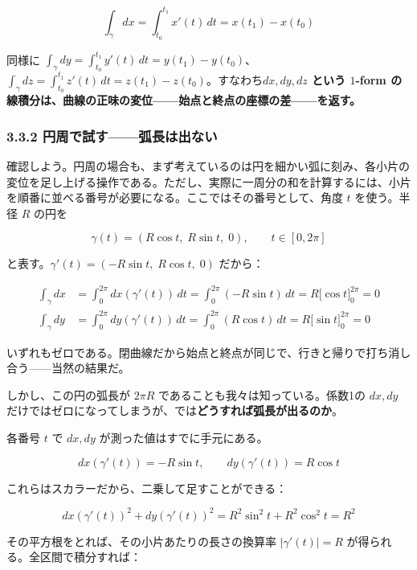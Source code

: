 \documentclass[a4paper,12pt,openany]{book}
\begin{document}
\[\int_\gamma dx = \int_{t_0}^{t_1} x'(t)\,dt = x(t_1) - x(t_0)\]

同様に
\(\int_\gamma dy = \int_{t_0}^{t_1} y'(t)\,dt = y(t_1) - y(t_0)\)、\(\int_\gamma dz = \int_{t_0}^{t_1} z'(t)\,dt = z(t_1) - z(t_0)\)。すなわち\textbf{$dx, dy, dz$ という $1$-form の線積分は、曲線の正味の変位——始点と終点の座標の差——を返す。}

\hypertarget{ux5186ux5468ux3067ux8a66ux3059ux5f27ux9577ux306fux51faux306aux3044}{%
\subsubsection{3.3.2
円周で試す——弧長は出ない}\label{ux5186ux5468ux3067ux8a66ux3059ux5f27ux9577ux306fux51faux306aux3044}}

確認しよう。円周の場合も、まず考えているのは円を細かい弧に刻み、各小片の変位を足し上げる操作である。ただし、実際に一周分の和を計算するには、小片を順番に並べる番号が必要になる。ここではその番号として、角度
\(t\) を使う。半径 \(R\) の円を

\[\gamma(t) = (R\cos t,\; R\sin t,\; 0),\qquad t \in [0, 2\pi]\]

と表す。\(\gamma'(t) = (-R\sin t,\; R\cos t,\; 0)\) だから：

\[\begin{aligned}
\int_\gamma dx &= \int_0^{2\pi} dx(\gamma'(t))\,dt = \int_0^{2\pi} (-R\sin t)\,dt = R\bigl[\cos t\bigr]_0^{2\pi} = 0 \\[4pt]
\int_\gamma dy &= \int_0^{2\pi} dy(\gamma'(t))\,dt = \int_0^{2\pi} (R\cos t)\,dt = R\bigl[\sin t\bigr]_0^{2\pi} = 0
\end{aligned}\]

いずれもゼロである。閉曲線だから始点と終点が同じで、行きと帰りで打ち消し合う——当然の結果だ。

しかし、この円の弧長が \(2\pi R\) であることも我々は知っている。係数1の
\(dx, dy\)
だけではゼロになってしまうが、では\textbf{どうすれば弧長が出るのか}。

各番号 \(t\) で \(dx, dy\) が測った値はすでに手元にある。

\[
dx(\gamma'(t)) = -R\sin t,\qquad dy(\gamma'(t)) = R\cos t
\]

これらはスカラーだから、二乗して足すことができる：

\[dx(\gamma'(t))^2 + dy(\gamma'(t))^2 = R^2\sin^2 t + R^2\cos^2 t = R^2\]

その平方根をとれば、その小片あたりの長さの換算率 \(|\gamma'(t)| = R\)
が得られる。全区間で積分すれば：
\end{document}
